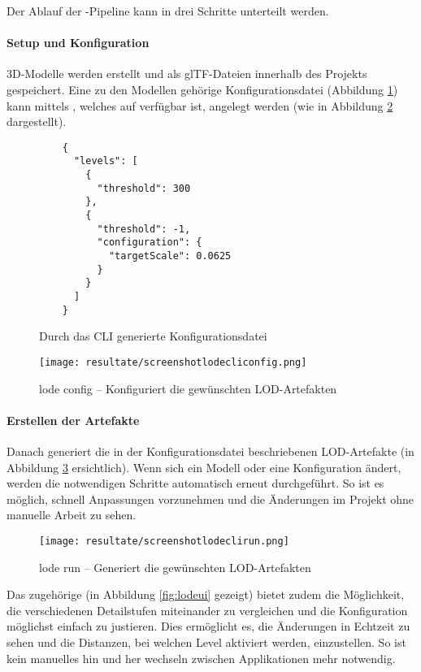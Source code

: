 Der Ablauf der -Pipeline kann in drei Schritte unterteilt werden.

\paragraph{Setup und Konfiguration}
3D-Modelle werden erstellt und als glTF-Dateien innerhalb des Projekts gespeichert. Eine zu den Modellen gehörige Konfigurationsdatei (Abbildung \ref{fig:lodeConfigFile}) kann mittels , welches auf  verfügbar ist, angelegt werden (wie in Abbildung \ref{fig:lodecliconfig} dargestellt).

\begin{figure}[H]
  \begin{lstlisting}
    {
      "levels": [
        {
          "threshold": 300
        },
        {
          "threshold": -1,
          "configuration": {
            "targetScale": 0.0625
          }
        }
      ]
    }
  \end{lstlisting}
\caption{Durch das CLI generierte Konfigurationsdatei}
\label{fig:lodeConfigFile}
\end{figure}

\begin{figure}[H]
  \centering
  \texttt{[image: resultate/screenshotlodecliconfig.png]}
  \caption{lode  config – Konfiguriert die gewünschten LOD-Artefakten}
  \label{fig:lodecliconfig}
\end{figure}

\paragraph{Erstellen der Artefakte}
Danach generiert  die in der Konfigurationsdatei beschriebenen LOD-Artefakte (in Abbildung \ref{fig:lodeclirun} ersichtlich). Wenn sich ein Modell oder eine Konfiguration ändert, werden die notwendigen Schritte automatisch erneut durchgeführt. So ist es möglich, schnell Anpassungen vorzunehmen und die Änderungen im Projekt ohne manuelle Arbeit zu sehen.

\begin{figure}[H]
  \centering
  \texttt{[image: resultate/screenshotlodeclirun.png]}
  \caption{lode  run – Generiert die gewünschten LOD-Artefakten}
  \label{fig:lodeclirun}
\end{figure}

Das zugehörige  (in Abbildung \ref{fig:lodeui} gezeigt) bietet zudem die Möglichkeit, die verschiedenen Detailstufen miteinander zu vergleichen und die Konfiguration möglichst einfach zu justieren. Dies ermöglicht es, die Änderungen in Echtzeit zu sehen und die Distanzen, bei welchen Level aktiviert werden, einzustellen. So ist kein manuelles hin und her wechseln zwischen Applikationen mehr notwendig.


